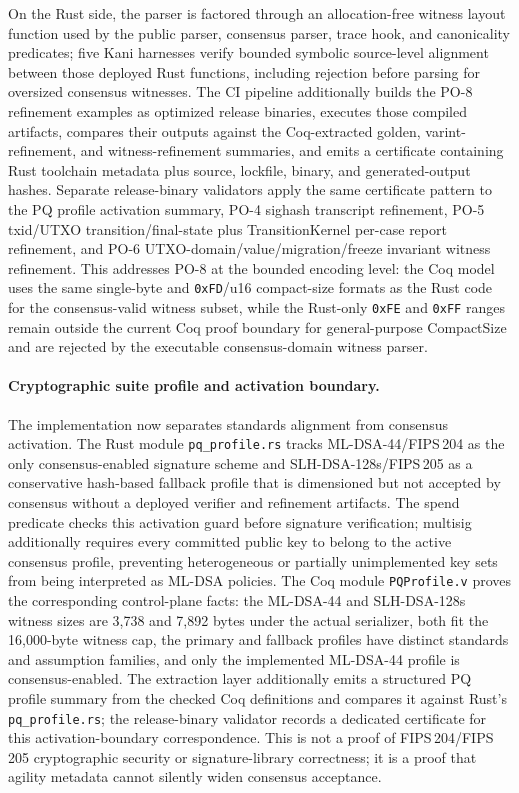 \documentclass[11pt]{article}
\begin{document}
On the Rust side, the parser is factored through an allocation-free witness layout function used by the public parser, consensus parser, trace hook, and canonicality predicates; five Kani harnesses verify bounded symbolic source-level alignment between those deployed Rust functions, including rejection before parsing for oversized consensus witnesses.
The CI pipeline additionally builds the PO-8 refinement examples as optimized release binaries, executes those compiled artifacts, compares their outputs against the Coq-extracted golden, varint-refinement, and witness-refinement summaries, and emits a certificate containing Rust toolchain metadata plus source, lockfile, binary, and generated-output hashes. Separate release-binary validators apply the same certificate pattern to the PQ profile activation summary, PO-4 sighash transcript refinement, PO-5 txid/UTXO transition/final-state plus TransitionKernel per-case report refinement, and PO-6 UTXO-domain/value/migration/freeze invariant witness refinement.
This addresses PO-8 at the bounded encoding level: the Coq model uses the same single-byte and \texttt{0xFD}/u16 compact-size formats as the Rust code for the consensus-valid witness subset, while the Rust-only \texttt{0xFE} and \texttt{0xFF} ranges remain outside the current Coq proof boundary for general-purpose CompactSize and are rejected by the executable consensus-domain witness parser.

\paragraph{Cryptographic suite profile and activation boundary.}
The implementation now separates standards alignment from consensus activation.
The Rust module \texttt{pq\_profile.rs} tracks ML-DSA-44/FIPS\,204 as the only consensus-enabled signature scheme and SLH-DSA-128s/FIPS\,205 as a conservative hash-based fallback profile that is dimensioned but not accepted by consensus without a deployed verifier and refinement artifacts.
The spend predicate checks this activation guard before signature verification; multisig additionally requires every committed public key to belong to the active consensus profile, preventing heterogeneous or partially unimplemented key sets from being interpreted as ML-DSA policies.
The Coq module \texttt{PQProfile.v} proves the corresponding control-plane facts: the ML-DSA-44 and SLH-DSA-128s witness sizes are 3{,}738 and 7{,}892 bytes under the actual serializer, both fit the 16{,}000-byte witness cap, the primary and fallback profiles have distinct standards and assumption families, and only the implemented ML-DSA-44 profile is consensus-enabled. The extraction layer additionally emits a structured PQ profile summary from the checked Coq definitions and compares it against Rust's \texttt{pq\_profile.rs}; the release-binary validator records a dedicated certificate for this activation-boundary correspondence.
This is not a proof of FIPS\,204/FIPS\,205 cryptographic security or signature-library correctness; it is a proof that agility metadata cannot silently widen consensus acceptance.
\end{document}
